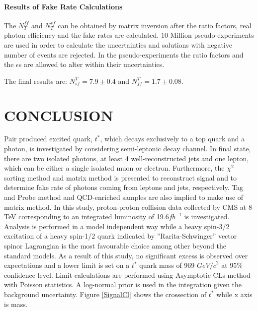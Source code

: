 \documentclass[12pt,oneandhalf,chaparabic,phys,ms,eng]{metu}
\begin{document}
\subsubsection{Results of Fake Rate Calculations}
\label{fakerate}

The $N^{ff}_{T}$ and $N^{sf}_{T}$ can be obtained by matrix inversion after the ratio factors, real photon efficiency and the fake rates are calculated. 10 Million pseudo-experiments are used in order to calculate the uncertainties and solutions with negative number of events are rejected. In the pseudo-experiments the ratio factors and the $\epsilon$s are allowed to alter within their uncertainties.

The final results are: $N_{sf}^{T} =  7.9 \pm 0.4$ and $N_{ff}^{T} =  1.7  \pm 0.08$.


\chapter{CONCLUSION}

Pair produced excited quark, $t^*$, which decays exclusively to a top quark and a photon, is investigated by considering semi-leptonic decay channel. In final state, there are two isolated photons, at least 4 well-reconstructed jets and one lepton, which can be either a single isolated muon or electron. Furthermore, the $\chi ^2$  sorting method and matrix method is presented to reconstruct signal and to determine fake rate of photons coming from leptons and jets, respectively. Tag and Probe method and QCD-enriched samples are also implied to make use of matrix method. In this study, proton-proton collision data collected by CMS at 8 TeV corresponding to an integrated luminosity of 19.6${fb}^{-1}$ is investigated. Analysis is performed in a model independent way while a heavy spin-3/2 excitation of a heavy spin-1/2 quark indicated by ”Rarita-Schwinger” vector spinor Lagrangian is the most favourable choice among other beyond the standard models. As a result of this study, no significant excess is observed over expectations and a lower limit is set on a $t^*$  quark mass of 969 ${GeV/c}^{2}$ at 95$\%$ confidence level. Limit calculations are performed using Asymptotic CLs method \cite{R22} with Poisson statistics. A log-normal prior is used in the integration given the background uncertainty. Figure \ref{SignalCl} shows the crossection of $t^*$  while x axis is mass. 
\end{document}
